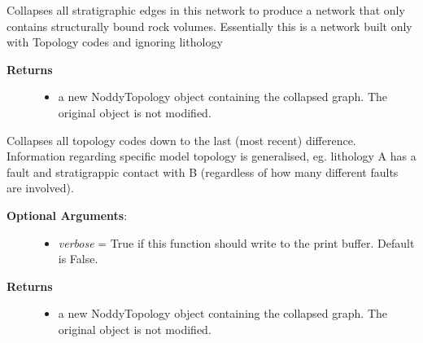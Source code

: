 \documentclass[a4paper,10pt,english]{sphinxmanual}
\begin{document}
\begin{fulllineitems}
\begin{fulllineitems}
\begin{description}
\begin{itemize}
\end{itemize}

\end{description}

\end{fulllineitems}


\begin{fulllineitems}
\label{pynoddy:pynoddy.output.NoddyTopology.collapse_stratigraphy}
Collapses all stratigraphic edges in this network to produce a network that only contains
structurally bound rock volumes. Essentially this is a network built only with Topology codes
and ignoring lithology
\begin{description}
\item[{\textbf{Returns}}] \leavevmode\begin{itemize}
\item {} 
a new NoddyTopology object containing the collapsed graph. The original object is not modified.

\end{itemize}

\end{description}

\end{fulllineitems}


\begin{fulllineitems}
\label{pynoddy:pynoddy.output.NoddyTopology.collapse_structure}
Collapses all topology codes down to the last (most recent) difference. Information regarding specific model topology is 
generalised, eg. lithology A has a fault and stratigrappic contact with B (regardless of how many different faults are involved).
\begin{description}
\item[{\textbf{Optional Arguments}:}] \leavevmode\begin{itemize}
\item {} 
\emph{verbose} = True if this function should write to the print buffer. Default is False.

\end{itemize}

\item[{\textbf{Returns}}] \leavevmode\begin{itemize}
\item {} 
a new NoddyTopology object containing the collapsed graph. The original object is not modified.


\end{itemize}
\end{description}
\end{fulllineitems}
\end{fulllineitems}
\end{document}
